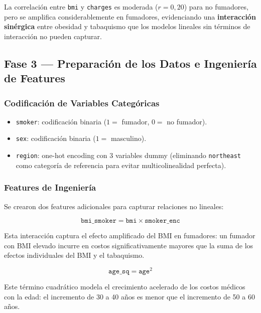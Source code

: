 \documentclass[12pt, a4paper]{article}
\begin{document}
La correlación entre \texttt{bmi} y \texttt{charges} es moderada
($r = 0{,}20$) para no fumadores, pero se amplifica considerablemente
en fumadores, evidenciando una \textbf{interacción sinérgica} entre
obesidad y tabaquismo que los modelos lineales sin términos de interacción
no pueden capturar.

\subsection{Fase 3 — Preparación de los Datos e Ingeniería de Features}

\subsubsection{Codificación de Variables Categóricas}

\begin{itemize}
  \item \texttt{smoker}: codificación binaria ($1 =$ fumador, $0 =$ no fumador).
  \item \texttt{sex}: codificación binaria ($1 =$ masculino).
  \item \texttt{region}: one-hot encoding con 3 variables dummy
        (eliminando \texttt{northeast} como categoría de referencia para
        evitar multicolinealidad perfecta).
\end{itemize}

\subsubsection{Features de Ingeniería}

Se crearon dos features adicionales para capturar relaciones no lineales:

\begin{equation}
\texttt{bmi\_smoker} = \texttt{bmi} \times \texttt{smoker\_enc}
\end{equation}

Esta interacción captura el efecto amplificado del BMI en fumadores:
un fumador con BMI elevado incurre en costos significativamente mayores
que la suma de los efectos individuales del BMI y el tabaquismo.

\begin{equation}
\texttt{age\_sq} = \texttt{age}^2
\end{equation}

Este término cuadrático modela el crecimiento acelerado de los costos
médicos con la edad: el incremento de 30 a 40 años es menor que el
incremento de 50 a 60 años.
\end{document}
